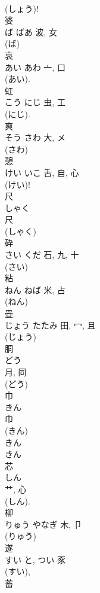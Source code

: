 \documentclass[8pt]{extreport}
\begin{document}
\begin{CJK}{UTF8}{min}
\\	(しょう)! 
\\	婆	
\\	ば	ばあ	波, 女	
\\	(ば) 
\\	哀	
\\	あい	あわ	亠, 口		
\\	(あい). 
\\	虹	
\\	こう	にじ	虫, 工	
\\	(にじ). 
\\	爽	
\\	そう	さわ	大, メ	
\\	(さわ) 
\\	憩	
\\	けい	いこ	舌, 自, 心	
\\	(けい)! 
\\	尺	
\\	しゃく	
\\	尺	
\\	(しゃく) 
\\	砕	
\\	さい	くだ	石, 九, 十	
\\	(さい) 
\\	粘	
\\	ねん	ねば	米, 占	
\\	(ねん) 
\\	畳	
\\	じょう	たたみ	田, 冖, 且	
\\	(じょう) 
\\	胴	
\\	どう	
\\	月, 同	
\\	(どう) 
\\	巾	
\\	きん	
\\	巾	
\\	(きん) 
\\	きん 
\\	きん 
\\	芯	
\\	しん	
\\	艹, 心	
\\	(しん). 
\\	柳	
\\	りゅう	やなぎ	木, 卩	
\\	(りゅう) 
\\	遂	
\\	すい	と, つい	豕	
\\	(すい), 
\\	蓄	

\end{CJK}
\end{document}
